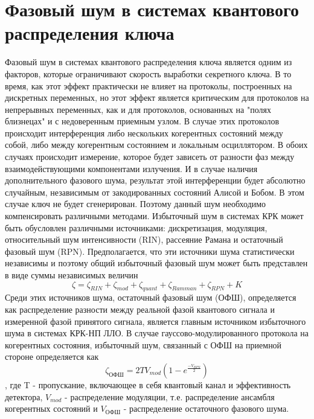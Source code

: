 \section{Фазовый шум в системах квантового распределения ключа}\label{sec:ch1/sect5}
Фазовый шум в системах квантового распределения ключа является одним из факторов, которые ограничивают скорость выработки секретного ключа. В то время, как этот эффект практически не влияет на протоколы, построенных на дискретных переменных, но этот эффект является критическим для протоколов на непрерывных переменных, как и для протоколов, основанных на "полях близнецах" и с недоверенным приемным узлом. В случае этих протоколов происходит интерференция либо нескольких когерентных состояний между собой, либо между когерентным состоянием и локальным осциллятором. В обоих случаях происходит измерение, которое будет зависеть от разности фаз между взаимодействующими компонентами излучения. И в случае наличия дополнительного фазового шума, результат этой интерференции будет абсолютно случайным, независимым от закодированных состояний Алисой и Бобом. В этом случае ключ не будет сгенерирован. Поэтому данный шум необходимо компенсировать различными методами.
\newline Избыточный шум в системах КРК может быть обусловлен различными источниками: дискретизация, модуляция, относительный шум интенсивности (RIN), рассеяние Рамана и  остаточный фазовый шум (RPN). Предполагается, что эти источники шума статистически независимы и поэтому общий избыточный фазовый шум может быть представлен в виде суммы независимых величин
\begin{equation}
    \zeta = \zeta_{RIN} + \zeta_{mod} + \zeta_{quant} + \zeta_{Ramman} + \zeta_{RPN} + K
    \label{eq:noise lit}
\end{equation}
Среди этих источников шума, остаточный фазовый шум (ОФШ), определяется как распределение разности между реальной фазой квантового сигнала и измеренной фазой принятого сигнала, является главным источником избыточного шума в системах КРК-НП ЛЛО. В случае гауссово-модулированного протокола на когерентных состояния, избыточный шум, связанный с ОФШ на приемной стороне определяется как 
\begin{equation}
    \zeta_{ОФШ} = 2TV_{mod}(1-e^\frac{-V_{RPN}}{2}) 
    \label{eq: noise phase llo lit}
\end{equation}, где T - пропускание, включающее в себя квантовый канал и эффективность детектора, $V_{mod}$ - распределение модуляции, т.е. распределение ансамбля когерентных состояний и $V_{ОФШ}$ - распределение остаточного фазового шума.

